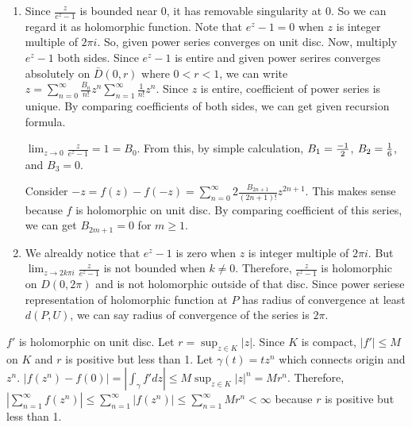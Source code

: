 \begin{problem}[3.4]
	\begin{enumerate}[label = (\alph*)]
		\item Since $\frac{z}{e^z -1}$ is bounded near 0, it has removable singularity at $0$. So we can regard it as holomorphic function. 
			Note that $e^z -1 = 0$ when $z$ is integer multiple of $2\pi i$. So, given power series converges on unit disc.
			Now, multiply $e^z -1$ both sides. Since $e^z-1$ is entire and given power serires converges absolutely on $\bar{D}(0, r)$ where $0<r<1$, we can write $z = \sum_{n=0}^\infty \frac{B_n}{n!}z^n \sum_{n=1}^\infty \frac{1}{n!}z^n$. 
			Since $z$ is entire, coefficient of power series is unique. By comparing coefficients of both sides, we can get given recursion formula.

			$\lim_{z \rightarrow 0} \frac{z}{e^z-1} = 1 = B_0$. From this, by simple calculation, $B_1 = {- 1\over 2}$, $B_2 = {1 \over 6}$, and $B_3 = 0$.

			Consider $-z = f(z) - f(-z) = \sum_{n=0}^\infty 2\frac{B_{2n+1}}{(2n+1)!}z^{2n+1}$. This makes sense because $f$ is holomorphic on unit disc. By comparing coefficient of this series, we can get $B_{2m+1} = 0$ for $m \geq 1$.
		\item We alrealdy notice that $e^z -1$ is zero when $z$ is integer multiple of $2\pi i$. But $\lim_{z \rightarrow 2k\pi i}\frac{z}{e^z - 1}$ is not bounded when $k \ne 0$. Therefore, $\frac{z}{e^z-1}$ is holomorphic on $D(0, 2\pi)$ and is not holomorphic outside of that disc. Since power seriese representation of holomorphic function at $P$ has radius of convergence at least $d(P, U)$, we can say radius of convergence of the series is $2\pi$. 
	\end{enumerate}
	
\end{problem}

\begin{problem}[3.5] \hfill

	$f'$ is holomorphic on unit disc. Let $r = \sup_{z \in K} |z|$. Since $K$ is compact, $|f'| \leq M$ on $K$ and $r$ is positive but less than 1. Let $\gamma(t) = tz^n$ which connects origin and $z^n$. $|f(z^n) - f(0)| = \left | \int_\gamma f' dz \right | \leq M \sup_{z\in K} |z|^n = Mr^n$.
	Therefore, $\left | \sum_{n=1}^\infty f(z^n) \right | \leq \sum_{n=1}^\infty |f(z^n)| \leq \sum_{n=1}^\infty Mr^n < \infty$ because $r$ is positive but less than 1.
	
\end{problem}

